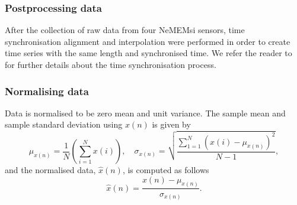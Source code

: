 \documentclass[fleqn,10pt]{wlscirep}
\begin{document}
\subsubsection*{Postprocessing data}
After the collection of raw data from four NeMEMsi sensors, time synchronisation alignment and interpolation were performed in order to create time series with the same length and synchronised time.
We refer the reader to \cite{Comotti2014} for further details about the time synchronisation process.

\subsubsection*{Normalising data}
Data is normalised to be zero mean and unit variance.
The sample mean and sample standard deviation using $x(n)$ is given by
\begin{equation}\label{eq:ms}
\mu_{x(n)}= \frac{1}{N} ( \sum_{i=1}^N x(i) ), \quad 
	\sigma_{x(n)} =  \sqrt{ \frac{  \sum_{1=1}^N ( x(i) - \mu_{x(n)} )^2 }{ N-1 }  },      
\end{equation}
and the normalised data, $\hat{x}(n)$, is computed as follows
\begin{equation}\label{eq:normalization}
\hat{x} (n) = \frac{   x(n) -  \mu_{x(n)}  }{   \sigma_{x(n)} }.   
\end{equation}
\end{document}
